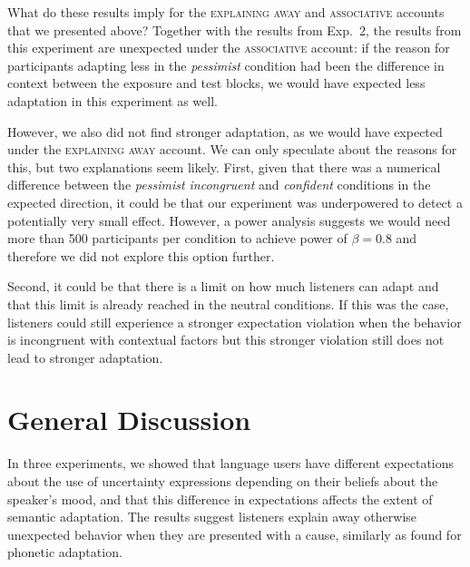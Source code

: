 What do these results imply for the \textsc{explaining away} and \textsc{associative} accounts that we presented above? Together with the results from Exp.~2, the results from this experiment are unexpected under the \textsc{associative} account: if the reason for participants adapting less in the \textit{pessimist} condition had been the difference in context between the exposure and test blocks, we would have expected less adaptation in this experiment as well.

However, we also did not find stronger adaptation, as we would have expected under the \textsc{explaining away} account. We can only speculate about the reasons for this, but two explanations seem likely. First, given that there was a numerical difference between the \textit{pessimist incongruent} and \textit{confident} conditions in the expected direction, it could be that our experiment was underpowered to detect a potentially very small effect. However, a power analysis suggests we would need more than 500 participants per condition to achieve power of $\beta=0.8$ and therefore we did not explore this option further.

Second, it could be that there is a limit on how much listeners can adapt and that this limit is already reached in the neutral conditions. If this was the case, listeners could still experience a stronger expectation violation when the behavior is incongruent with contextual factors but this stronger violation still does not lead to stronger adaptation. 


\section{General Discussion}

In three experiments, we showed that language users have different expectations about the use of uncertainty expressions depending on their beliefs about the speaker's mood, and that this difference in expectations affects the extent of semantic adaptation. The results suggest listeners explain away otherwise unexpected behavior when they are presented with a cause, similarly as \textcite{Kraljic2008} found for phonetic adaptation.

